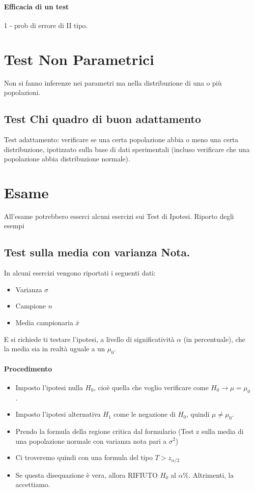\paragraph*{Efficacia di un test} 1 - prob di errore di II tipo.

\section*{Test Non Parametrici} Non si fanno inferenze nei parametri ma nella
distribuzione di una o più popolazioni.
\subsection{Test Chi quadro di buon adattamento}
Test adattamento: verificare se una certa popolazione abbia o meno una certa distribuzione,
ipotizzato sulla base di dati sperimentali (incluso verificare che una popolazione
abbia distribuzione normale).



\section{Esame}
All'esame potrebbero esserci alcuni esercizi sui Test di Ipotesi. Riporto degli esempi

\subsection{Test sulla media con varianza Nota.}
In alcuni esercizi vengono riportati i seguenti dati:
\begin{itemize}
    \item Varianza $\sigma$
    \item Campione $n$
    \item Media campionaria $\bar{x}$
\end{itemize}
E si richiede ti testare l'ipotesi, a livello di significatività $\alpha$ (in percentuale), che la media sia in realtà uguale a un $\mu_0$.
\paragraph{Procedimento}
\begin{itemize}
    \item Imposto l'ipotesi nulla $H_0$, cioè quella che voglio verificare come $H_0 \to \mu = \mu_0$.
    \item Imposto l'ipotesi alternativa $H_1$ come le negazione di $H_0$, quindi $\mu \neq \mu_0$.
    \item Prendo la formula della regione critica dal formulario (Test z sulla media di una popolazione normale con varianza nota pari a $\sigma^2$)
    \item Ci troveremo quindi con una formula del tipo $T>z_{\alpha/2}$
    \item Se questa disequazione è vera, allora RIFIUTO $H_0$ al $\alpha \%$. Altrimenti, la accettiamo.
\end{itemize}